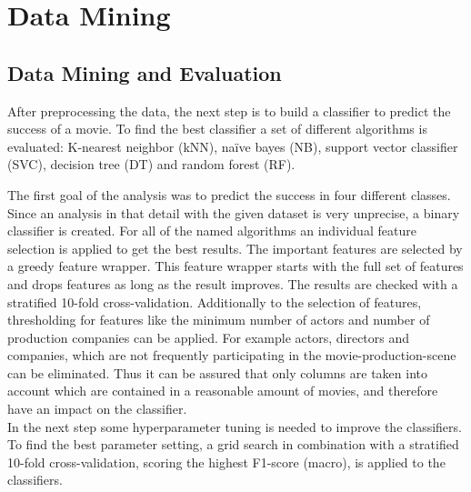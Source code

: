 \begingroup
\renewcommand{\clearpage}{}
\chapter{Data Mining}\label{cha:data_mining}
\endgroup

\section{Data Mining and Evaluation}
After preprocessing the data, the next step is to build a classifier to predict the success of a movie. To find the best classifier a set of different algorithms is evaluated:
K-nearest neighbor (kNN), 
na\"{i}ve bayes (NB), 
support vector classifier (SVC), 
decision tree (DT) and 
random forest (RF).


The first goal of the analysis was to predict the success in four different classes. Since an analysis in that detail with the given dataset is very unprecise, a binary classifier is created.
For all of the named algorithms an individual feature selection is applied to get the best results. The important features are selected by a greedy feature wrapper. This feature wrapper starts with the full set of features and drops features as long as the result improves. The results are checked with a stratified 10-fold cross-validation. Additionally to the selection of features, thresholding for features like the minimum number of actors and number of production companies can be applied. For example actors, directors and companies, which are not frequently participating in the movie-production-scene can be eliminated. Thus it can be assured that only columns are taken into account which are contained in a reasonable amount of movies, and therefore have an impact on the classifier. \\
In the next step some hyperparameter tuning is needed to improve the classifiers. To find the best parameter setting, a grid search in combination with a stratified 10-fold cross-validation, scoring the highest F1-score (macro), is applied to the classifiers.

